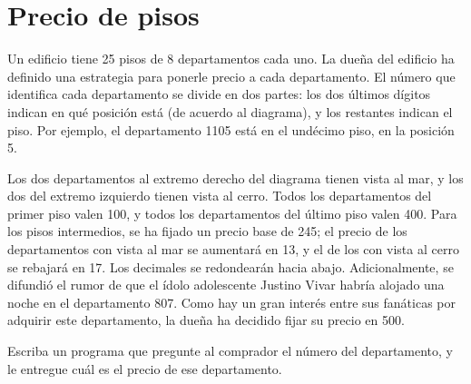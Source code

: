 \section{Precio de pisos}
  Un edificio tiene 25 pisos
  de 8 departamentos  cada  uno.
  La dueña del edificio ha definido una estrategia
  para ponerle precio a cada departamento.
  El número que identifica cada departamento 
  se divide en dos partes: 
  los dos últimos dígitos indican en qué posición
  está (de acuerdo al diagrama),
  y los restantes  indican  el  piso.
  Por ejemplo, el departamento 1105
  está en el undécimo piso,
  en la posición 5.
  
  \begin{center}
  \end{center}
  
  Los dos departamentos al extremo derecho del diagrama
  tienen vista al mar,
  y los dos del extremo izquierdo tienen vista al cerro.
  Todos los departamentos del primer piso valen 100,
  y todos los departamentos del último piso valen 400.
  Para los pisos intermedios, 
  se ha fijado un precio base de 245;
  el precio de los departamentos con vista al mar
  se aumentará en 13,
  y el de los con vista al cerro 
  se rebajará en 17.
  Los decimales se redondearán hacia abajo.
  Adicionalmente,
  se difundió el rumor de que el
  ídolo adolescente Justino Vivar
  habría alojado una noche en el departamento 807.
  Como hay un gran interés entre sus fanáticas
  por adquirir este departamento,
  la dueña ha decidido fijar su precio en 500.

  Escriba un programa que pregunte al comprador
  el número del departamento,
  y le entregue cuál es el precio de ese departamento.
